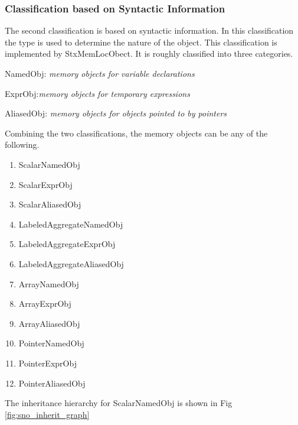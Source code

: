 \documentclass{article}
\begin{document}
\subsubsection{Classification based on Syntactic Information}
The second classification is based on syntactic information. In this
classification the type is used to determine the nature of the
object. This classification is implemented by StxMemLocObect.
 It is roughly classified into three categories.
\begin{description}
\item NamedObj: \emph{memory objects for variable declarations}
\item ExprObj:\emph{memory objects for temporary expressions}
\item AliasedObj: \emph{memory objects for objects pointed to by pointers}
\end{description}
Combining the two classifications, the memory objects can be any of
the following.
\begin{enumerate}
\item ScalarNamedObj
\item ScalarExprObj
\item ScalarAliasedObj
\item LabeledAggregateNamedObj
\item LabeledAggregateExprObj
\item LabeledAggregateAliasedObj
\item ArrayNamedObj
\item ArrayExprObj
\item ArrayAliasedObj
\item PointerNamedObj
\item PointerExprObj
\item PointerAliasedObj
\end{enumerate}
The inheritance hierarchy for ScalarNamedObj is shown in Fig \ref{fig:sno_inherit_graph}
\end{document}
